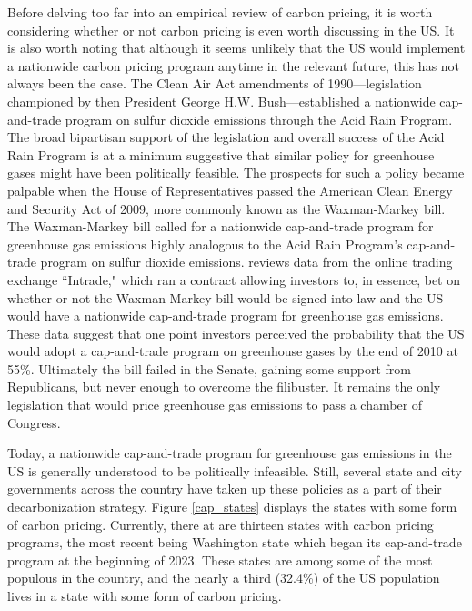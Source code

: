 Before delving too far into an empirical review of carbon pricing, it is worth considering whether or not carbon pricing is even worth discussing in the US. It is also worth noting that although it seems unlikely that the US would implement a nationwide carbon pricing program anytime in the relevant future, this has not always been the case. The Clean Air Act amendments of 1990---legislation championed by then President George H.W. Bush---established a nationwide cap-and-trade program on sulfur dioxide emissions through the Acid Rain Program. The broad bipartisan support of the legislation and overall success of the Acid Rain Program is at a minimum suggestive that similar policy for greenhouse gases might have been politically feasible. The prospects for such a policy became palpable when the House of Representatives passed the American Clean Energy and Security Act of 2009, more commonly known as the Waxman-Markey bill. The Waxman-Markey bill called for a nationwide cap-and-trade program for greenhouse gas emissions highly analogous to the Acid Rain Program's cap-and-trade program on sulfur dioxide emissions. \cite{meng2017using} reviews data from the online trading exchange ``Intrade," which ran a contract allowing investors to, in essence,  bet on whether or not the Waxman-Markey bill would be signed into law and the US would have a nationwide cap-and-trade program for greenhouse gas emissions. These data suggest that one point investors perceived the probability that the US would adopt a cap-and-trade program on greenhouse gases by the end of 2010 at 55\%. Ultimately the bill failed in the Senate, gaining some support from Republicans, but never enough to overcome the filibuster. It remains the only legislation that would price greenhouse gas emissions to pass a chamber of Congress. 

Today, a nationwide cap-and-trade program for greenhouse gas emissions in the US is generally understood to be politically infeasible. Still, several state and city governments across the country have taken up these policies as a part of their decarbonization strategy. Figure \ref{cap_states} displays the states with some form of carbon pricing. Currently, there at are thirteen states with carbon pricing programs, the most recent being Washington state which began its cap-and-trade program at the beginning of 2023. These states are among some of the most populous in the country, and the nearly a third (32.4\%) of the US population lives in a state with some form of carbon pricing. 


